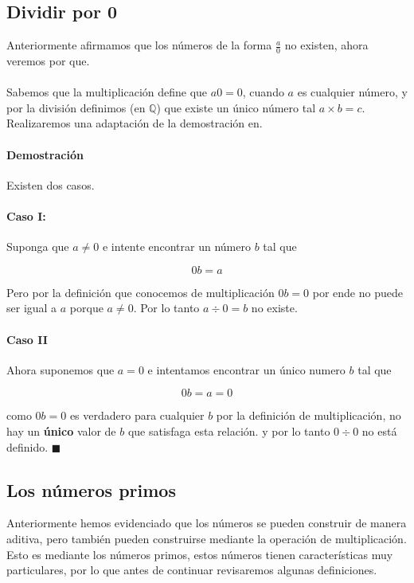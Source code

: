 \documentclass{article}
\begin{document}
\subsection{Dividir por 0}

Anteriormente afirmamos que los números de la forma $\frac{a}{0}$ no existen, ahora veremos por que.

\paragraph{}Sabemos que la multiplicación define que $a0 = 0$, cuando $a$ es cualquier número, y por la división definimos (en $\mathbb{Q}$) que existe un único número tal $a \times b = c$. Realizaremos una adaptación de la demostración en\cite{brink_1933}.

\paragraph{Demostración} Existen dos casos.

\paragraph{Caso I:} Suponga que $a \neq 0$ e intente encontrar un número $b$ tal que

$$0b = a$$

Pero por la definición que conocemos de multiplicación $0b = 0$ por ende no puede ser igual a $a$ porque $a \neq 0$. Por lo tanto $a \div 0 = b$ no existe.

\paragraph{Caso II} Ahora suponemos que $a = 0$ e intentamos encontrar un único numero $b$ tal que 

$$0b = a = 0$$

como $0b = 0$ es verdadero para cualquier $b$ por la definición de multiplicación, no hay un \textbf{único} valor de $b$ que satisfaga esta relación. y por lo tanto $0 \div 0$ no está definido. $\blacksquare$

\subsection{Los números primos} Anteriormente hemos evidenciado que los números se pueden construir de manera aditiva, pero también pueden construirse mediante la operación de multiplicación. Esto es mediante los números primos, estos números tienen características muy particulares, por lo que antes de continuar revisaremos algunas definiciones.
\end{document}
